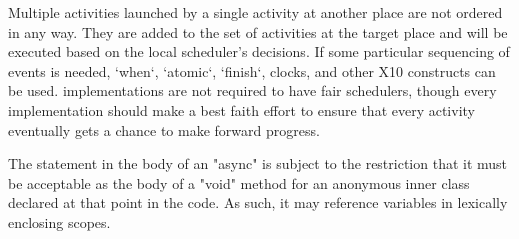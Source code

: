 
Multiple activities launched by a single activity at another place are not
ordered in any way. They are added to the set of activities at the target
place and will be executed based on the local scheduler's decisions.
If some particular sequencing of events is needed, \xcd`when`, \xcd`atomic`,
\xcd`finish`, clocks, and other X10 constructs can be used.
\Xten{} implementations are not required to have fair schedulers,
though every implementation should make a best faith effort to ensure
that every activity eventually gets a chance to make forward progress.

\begin{staticrule*}
The statement in the body of an \xcd"async" is subject to the
restriction that it must be acceptable as the body of a \xcd"void"
method for an anonymous inner class declared at that point in the code. As
such, it may reference variables in lexically enclosing scopes.
\end{staticrule*}

